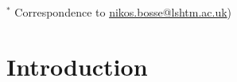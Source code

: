 \documentclass{article}
\begin{document}

\bigskip

{\footnotesize $^*$ Correspondence to \url{nikos.bosse@lshtm.ac.uk})}



\newpage


\section{Introduction}
\end{document}
